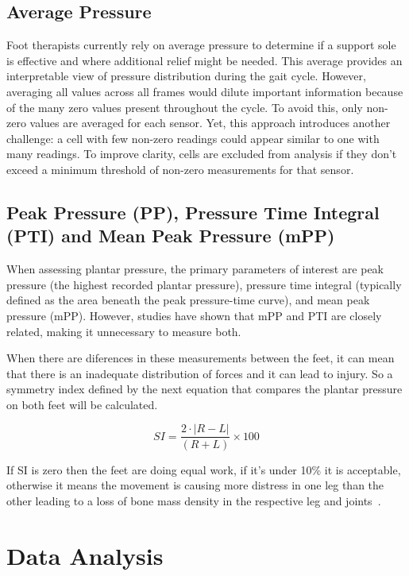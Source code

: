 \subsection{Average Pressure}
\label{ssec:average_pressure}

Foot therapists currently rely on average pressure to determine if a support sole is effective and where additional relief might be needed. This average provides an interpretable view 
of pressure distribution during the gait cycle. However, averaging all values across all frames would dilute important information because of the many zero values present throughout 
the cycle. To avoid this, only non-zero values are averaged for each sensor. Yet, this approach introduces another challenge: a cell with few non-zero readings could appear similar to 
one with many readings. To improve clarity, cells are excluded from analysis if they don't exceed a minimum threshold of non-zero measurements for that sensor\cite{masterInsole}.


\subsection{Peak Pressure (PP), Pressure Time Integral (PTI) and Mean Peak Pressure (mPP)}
\label{ssec:pp_pti_mPP}

When assessing plantar pressure, the primary parameters of interest are peak pressure (the highest recorded plantar pressure), pressure time integral (typically defined as the 
area beneath the peak pressure-time curve), and mean peak pressure (mPP). However, studies have shown that mPP and PTI are closely related, making it unnecessary to measure both.

When there are diferences in these measurements between the feet, it can mean that there is an inadequate distribution of forces and it can lead to injury. So a symmetry index defined by 
the next equation that compares the plantar pressure on both feet will be calculated.

\[ SI = \frac{2 \cdot \left\lvert R - L\right\rvert }{(R + L)} \times 100 \]

If SI is zero then the feet are doing equal work, if it's under 10\% it is acceptable, otherwise it means the movement is causing more distress in one leg than the other leading to a 
loss of bone mass density in the respective leg and joints~\cite{coimbra}.


\newpage
\section{Data Analysis}
\label{sec:data_analysis}

